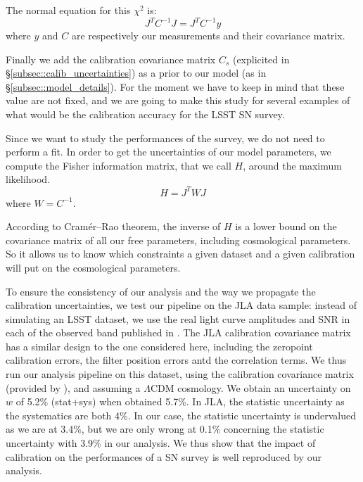 \documentclass[\docopts]{\docclass}
\begin{document}
The normal equation for this $\chi^2$ is:
\begin{equation}
J^TC^{-1}J = J^TC^{-1}y
\end{equation}
where $y$ and $C$ are respectively our measurements and their covariance matrix.

Finally we add the calibration covariance matrix $C_s$ (explicited in §\ref{subsec::calib_uncertainties}) as a prior to our model (as in §\ref{subsec::model_details}).
For the moment we have to keep in mind that these value are not fixed, and we are going to make this study for several examples of what would be the calibration accuracy for the LSST SN survey.

Since we want to study the performances of the survey, we do not need to perform a fit.
In order to get the uncertainties of our model parameters, we compute the Fisher information matrix, that we call $H$, around the maximum likelihood.
\begin{equation}
H = J^TWJ
\end{equation}
where $W = C^{-1}$.

According to Cramér–Rao theorem, the inverse of $H$ is a lower bound on the covariance matrix of all our free parameters, including cosmological parameters.
So it allows us to know which constraints a given dataset and a given calibration will put on the cosmological parameters.

To ensure the consistency of our analysis and the way we propagate the calibration uncertainties, we test our pipeline on the JLA data sample: instead of simulating an LSST dataset, we use the real light curve amplitudes and SNR in each of the observed band published in \cite{1401.4064}.
The JLA calibration covariance matrix has a similar design to the one considered here, including the zeropoint calibration errors, the filter position errors antd the correlation terms.
We thus run our analysis pipeline on this dataset, using the calibration covariance matrix (provided by \cite{1401.4064}), and assuming a $\Lambda\mathrm{CDM}$ cosmology.
We obtain an uncertainty on $w$ of 5.2\% (stat+sys) when \cite{1401.4064} obtained 5.7\%.
In JLA, the statistic uncertainty as the systematics are both 4\%. In our case, the statistic uncertainty is undervalued as we are at 3.4\%, but we are only wrong at 0.1\% concerning the statistic uncertainty with 3.9\% in our analysis.
We thus show that the impact of calibration on the performances of a SN survey is well reproduced by our analysis.

\end{document}
